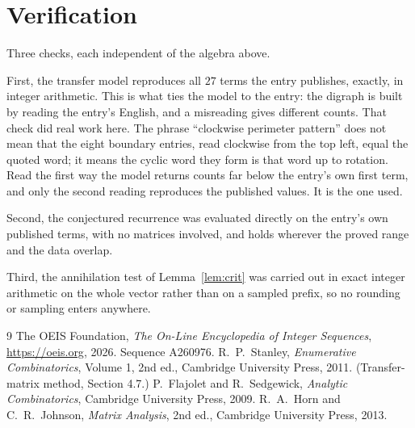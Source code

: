 \documentclass[11pt,a4paper]{article}
\theoremstyle{plain}
\theoremstyle{definition}
\begin{document}
\section{Verification}

Three checks, each independent of the algebra above.

First, the transfer model reproduces all $27$ terms the entry publishes, exactly, in
integer arithmetic. This is what ties the model to the entry: the digraph is built by reading
the entry's English, and a misreading gives different counts. That check did real work here. The phrase ``clockwise perimeter pattern'' does not mean that the eight boundary entries, read clockwise from the top left, equal the quoted word; it means the cyclic word they form is that word up to rotation. Read the first way the model returns counts far below the entry's own first term, and only the second reading reproduces the published values. It is the one used.

Second, the conjectured recurrence was evaluated directly on the entry's own published terms,
with no matrices involved, and holds wherever the proved range and the data overlap.

Third, the annihilation test of Lemma~\ref{lem:crit} was carried out in exact integer
arithmetic on the whole vector rather than on a sampled prefix, so no rounding or sampling
enters anywhere.

\begin{thebibliography}{9}
 The OEIS Foundation, \emph{The On-Line Encyclopedia of Integer
Sequences}, \url{https://oeis.org}, 2026. Sequence A260976.
 R.~P.~Stanley, \emph{Enumerative Combinatorics}, Volume 1, 2nd ed.,
Cambridge University Press, 2011. (Transfer-matrix method, Section 4.7.)
 P.~Flajolet and R.~Sedgewick, \emph{Analytic Combinatorics}, Cambridge
University Press, 2009.
 R.~A.~Horn and C.~R.~Johnson, \emph{Matrix Analysis}, 2nd ed., Cambridge
University Press, 2013.
\end{thebibliography}
\end{document}
